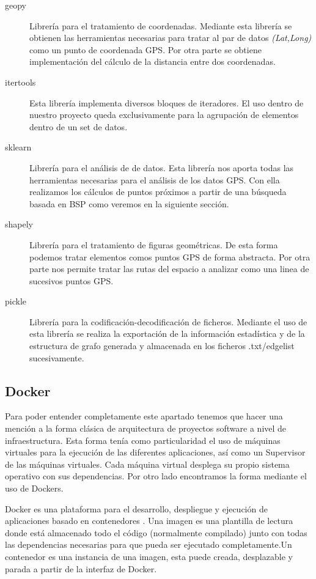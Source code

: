 \begin{description}
\item[geopy] Librería para el tratamiento de coordenadas. Mediante esta librería se obtienen las herramientas necesarias para tratar al par de datos \textit{(Lat,Long)} como un punto de coordenada  \ac{GPS}. Por otra parte se obtiene implementación del cálculo de la distancia entre dos coordenadas.
\item[itertools] Esta librería implementa diversos bloques de iteradores. El uso dentro de nuestro proyecto queda exclusivamente para la agrupación de elementos dentro de un set de datos.
\item[sklearn] Librería para el análisis de de datos. Esta librería nos aporta todas las herramientas necesarias para el análisis de los datos \ac{GPS}. Con ella realizamos los cálculos de puntos próximos a partir de una búsqueda basada en \ac{BSP} como veremos en la siguiente sección.
\item[shapely] Librería para el tratamiento de figuras geométricas. De esta forma podemos tratar elementos comos puntos \ac{GPS} de forma abstracta. Por otra parte nos permite tratar las rutas del espacio a analizar como una linea de sucesivos puntos \ac{GPS}.
\item[pickle] Librería para la codificación-decodificación de ficheros. Mediante el uso de esta librería se realiza la exportación de la información estadística y de la estructura de grafo generada y almacenada en los ficheros .txt/edgelist sucesivamente.
\end{description}

\subsection{Docker}
Para poder entender completamente este apartado tenemos que hacer una mención a la forma clásica de arquitectura de 
proyectos software a nivel de infraestructura. Esta forma tenía como particularidad el uso de máquinas virtuales para la 
ejecución de las diferentes aplicaciones, así como un Supervisor de las máquinas virtuales.  Cada máquina virtual desplega
su propio sistema operativo con sus dependencias. Por otro lado encontramos la forma mediante el uso de Dockers.

Docker es una plataforma para el desarrollo, despliegue y ejecución de aplicaciones basado en contenedores \cite{Docker01}.  Una imagen es 
una plantilla de lectura donde está almacenado todo el código (normalmente compilado) junto con todas las dependencias 
necesarias para que pueda ser ejecutado completamente.Un contenedor es una instancia de una imagen, esta puede creada, 
desplazable y parada a partir de la interfaz de Docker.

